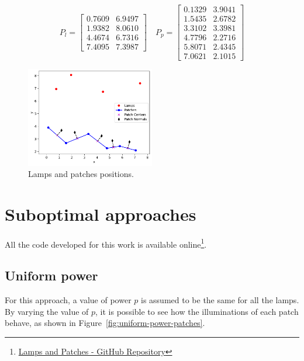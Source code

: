 \documentclass[11pt,a4paper]{article}
\begin{document}
\begin{equation*}
    P_l = \begin{bmatrix}
        0.7609 & 6.9497\\
        1.9382 & 8.0610\\
        4.4674 & 6.7316\\
        7.4095 & 7.3987
    \end{bmatrix}
    \quad
    P_{p} = \begin{bmatrix}
        0.1329 & 3.9041\\
        1.5435 & 2.6782\\
        3.3102 & 3.3981\\
        4.7796 & 2.2716\\
        5.8071 & 2.4345\\
        7.0621 & 2.1015
    \end{bmatrix}
    \label{eq:positions}
\end{equation*}

\begin{figure}[!htb]
    \centering
    \includegraphics[width=0.5\textwidth]{figures/lamps-patches-position.pdf}
    \caption{Lamps and patches positions.}\label{fig:lamps-patches-position}
\end{figure}

\newpage

\section{Suboptimal approaches}

All the code developed for this work is available online\footnote{\href{https://github.com/felypemaciel/lamps/blob/main/lamps.ipynb}{Lamps and Patches - GitHub Repository}}.

\subsection{Uniform power}

For this approach, a value of power $p$ is assumed to be the same for all the lamps. By varying the value of $p$, it is possible to see how the illuminations of each patch behave, as shown in Figure~\ref{fig:uniform-power-patches}.
\end{document}
